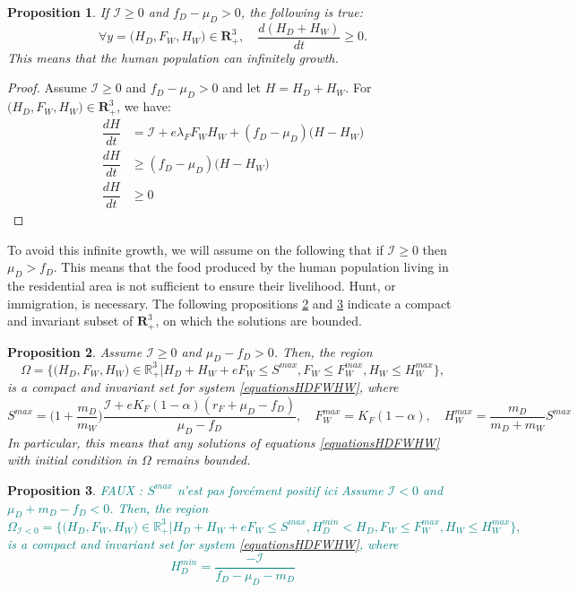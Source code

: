 \documentclass{article}
\newcommand{\lfw}{\lambda_{F}}
\newcommand{\lfw}{\lambda_{F}}
\newcommand{\cI}{\mathcal{I}}
\newcommand{\marc}[1]{\textcolor{teal}{#1}}
\newtheorem{prop}{Proposition}
\begin{document}
\begin{prop}
If $\cI \geq 0$ and $f_D - \mu_D > 0$, the following is true:
$$
\forall	y=\Big(H_D, F_W, H_W\Big) \in \mathbf{R}^3_+, \quad \dfrac{d(H_D + H_W)}{dt} \geq 0.
$$
This means that the human population can infinitely growth.
\end{prop}

\begin{proof}
Assume $\cI \geq 0$ and $f_D - \mu_D > 0$ and let $H = H_D + H_W$. For $\Big(H_D, F_W, H_W\Big) \in \mathbf{R}^3_+$, we have:
\begin{align*}
\dfrac{dH}{dt} &= \cI + e \lfw F_W H_W + (f_D - \mu_D) \Big(H - H_W \Big) \\
\dfrac{dH}{dt} & \geq (f_D - \mu_D) \Big(H - H_W \Big) \\
\dfrac{dH}{dt} & \geq 0
\end{align*}
\end{proof}

To avoid this infinite growth, we will assume on the following that if $\cI \geq 0$ then $\mu_D > f_D$. This means that the food produced by the human population living in the residential area is not sufficient to ensure their livelihood. Hunt, or immigration, is necessary.  The following propositions \ref{Invariant region, cI>=0} and \ref{Invariant region, cI<0} indicate a compact and invariant subset of $\mathbf{R}_+^3$, on which the solutions are bounded.

\begin{prop}\label{Invariant region, cI>=0} 
Assume $\cI \geq 0$ and $\mu_D - f_D > 0$. Then, the region
$$\Omega = \Big\{\Big(H_D, F_W, H_W \Big) \in \mathbb{R}_+^3  \Big|H_D + H_W + eF_W \leq S^{max}, F_W \leq F_W^{max}, H_W \leq H_W^{max} \Big\},$$
is a compact and invariant set for system \eqref{equationsHDFWHW}, 
where
$$
S^{max} = \Big(1 + \dfrac{m_D}{m_W} \Big) \dfrac{\cI + e K_F (1-\alpha) (r_F + \mu_D - f_D)}{\mu_D - f_D},
\quad
F_W^{max} = K_F(1-\alpha),
\quad
H_W^{max} = \dfrac{m_D}{m_D + m_W} S^{max}
$$
In particular, this means that any solutions of equations \eqref{equationsHDFWHW} with initial condition in $\Omega$ remains bounded.
\end{prop}

\begin{prop}\label{Invariant region, cI<0} 
\marc{ FAUX : $S^{max}$ n'est pas forcément positif ici
Assume $\cI < 0$ and $\mu_D + m_D - f_D < 0$. Then, the region
$$\Omega_{\cI < 0} = \Big\{\Big(H_D, F_W, H_W \Big) \in \mathbb{R}_+^3  \Big|H_D + H_W + eF_W \leq S^{max}, H_D^{min} < H_D, F_W \leq F_W^{max}, H_W \leq H_W^{max} \Big\},$$
is a compact and invariant set for system \eqref{equationsHDFWHW}, where 
$$
H_D^{min} = \dfrac{-\cI}{f_D - \mu_D - m_D}
$$}
\end{prop}
\end{document}
